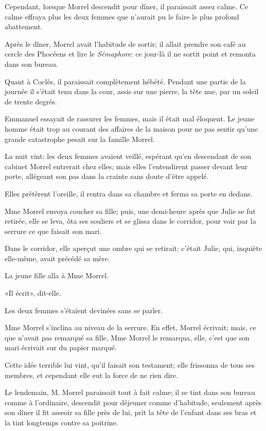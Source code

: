 Cependant, lorsque Morrel descendit pour dîner, il paraissait assez calme. Ce calme effraya plus les deux femmes que n'aurait pu le faire le plus profond abattement.

Après le dîner, Morrel avait l'habitude de sortir; il allait prendre son café au cercle des Phocéens et lire le \textit{Sémaphore}: ce jour-là il ne sortit point et remonta dans son bureau.

Quant à Coclès, il paraissait complètement hébété. Pendant une partie de la journée il s'était tenu dans la cour, assis sur une pierre, la tête nue, par un soleil de trente degrés.

Emmanuel essayait de rassurer les femmes, mais il était mal éloquent. Le jeune homme était trop au courant des affaires de la maison pour ne pas sentir qu'une grande catastrophe pesait sur la famille Morrel.

La nuit vint: les deux femmes avaient veillé, espérant qu'en descendant de son cabinet Morrel entrerait chez elles; mais elles l'entendirent passer devant leur porte, allégeant son pas dans la crainte sans doute d'être appelé.

Elles prêtèrent l'oreille, il rentra dans sa chambre et ferma sa porte en dedans.

Mme Morrel envoya coucher sa fille; puis, une demi-heure après que Julie se fut retirée, elle se leva, ôta ses souliers et se glissa dans le corridor, pour voir par la serrure ce que faisait son mari.

Dans le corridor, elle aperçut une ombre qui se retirait: c'était Julie, qui, inquiète elle-même, avait précédé sa mère.

La jeune fille alla à Mme Morrel.

«Il écrit», dit-elle.

Les deux femmes s'étaient devinées sans se parler.

Mme Morrel s'inclina au niveau de la serrure. En effet, Morrel écrivait; mais, ce que n'avait pas remarqué sa fille, Mme Morrel le remarqua, elle, c'est que son mari écrivait sur du papier marqué.

Cette idée terrible lui vint, qu'il faisait son testament; elle frissonna de tous ses membres, et cependant elle eut la force de ne rien dire.

Le lendemain, M. Morrel paraissait tout à fait calme; il se tint dans son bureau comme à l'ordinaire, descendit pour déjeuner comme d'habitude, seulement après son dîner il fit asseoir sa fille près de lui, prit la tête de l'enfant dans ses bras et la tint longtemps contre sa poitrine.

